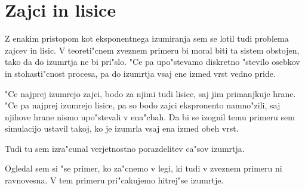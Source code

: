 \documentclass[a4paper,10pt]{article}
\begin{document}
\section{Zajci in lisice}

Z enakim pristopom kot eksponentnega izumiranja sem se lotil tudi problema zajcev in lisic. V teoreti"cnem zveznem primeru bi moral biti ta sistem obstojen, tako da do izumrtja ne bi pri"slo. "Ce pa upo"stevamo diskretno "stevilo osebkov in stohasti"cnost procesa, pa do izumrtja vsaj ene izmed vrst vedno pride. 

"Ce najprej izumrejo zajci, bodo za njimi tudi lisice, saj jim primanjkuje hrane. "Ce pa najprej izumrejo lisice, pa so bodo zajci ekspronento namno"zili, saj njihove hrane nismo upo"stevali v ena"cbah. Da bi se izognil temu primeru sem simulacijo ustavil takoj, ko je izumrla vsaj ena izmed obeh vrst. 

Tudi tu sem izra"cunal verjetnostno porazdelitev ca"sov izumrtja. 



Ogledal sem si "se primer, ko za"cnemo v legi, ki tudi v zveznem primeru ni ravnovesna. V tem primeru pri"cakujemo hitrej"se izumrtje. 



\end{document}
